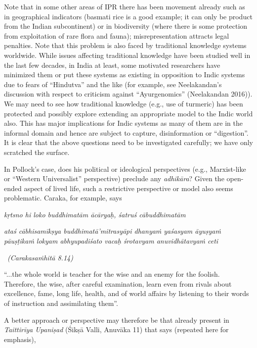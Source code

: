 Note that in some other areas of IPR there has been movement already such as in geographical indicators (basmati rice is a good example; it can only be product from the Indian subcontinent) or in biodiversity (where there is some protection from exploitation of rare flora and fauna); misrepresentation attracts legal penalties. Note that this problem is also faced by traditional knowledge systems worldwide. While issues affecting traditional knowledge have been studied well in the last few decades, in India at least, some motivated researchers have minimized them or put these systems as existing in opposition to Indic systems due to fears of “Hindutva” and the like (for example, see Neelakandan’s discussion with respect to criticism against “Ayurgenomics” (Neelakandan 2016)).  We may need to see how traditional knowledge (e.g., use of turmeric) has been protected and possibly explore extending an appropriate model to the Indic world also. This has major implications for Indic systems as many of them are in the informal domain and hence are subject to capture, disinformation or “digestion”. It is clear that the above questions need to be investigated carefully; we have only scratched the surface.

In Pollock’s case, does his political or ideological perspectives (e.g., Marxist-like or “Western Universalist” perspective) preclude any {\sl adhikāra}? Given the open-ended aspect of lived life, such a restrictive perspective or model also seems problematic. Caraka, for example, says

\begin{myquote}
{\sl kṛtsno hi loko buddhimatām ācāryaḥ, śatruś cābuddhimatām}

{\sl ataś cābhisamīkṣya buddhimatā’mitrasyāpi dhanyaṁ yaśasyam āyuṣyaṁ pāuṣṭikaṁ lokyam abhyupadiśato vacaḥ śrotavyam anuvidhātavyaṁ ceti}

~\hfill {\sl (Carakasaṁhitā 8.14)}

{\rm “...the whole world is teacher for the wise and an enemy for the foolish. Therefore, the wise, after careful examination, learn even from rivals about excellence, fame, long life, health, and of world affairs by listening to their words of instruction and assimilating them”.}
\end{myquote}

A better approach or perspective may therefore be that already present in {\sl Taittirīya Upaniṣad} (Śikṣā Valli, Anuvāka 11) that says (repeated here for emphasis), 


